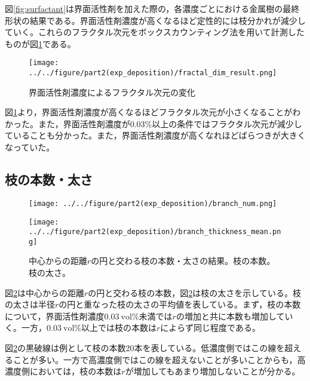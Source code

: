 \documentclass[autodetect-engine,dvi=dvipdfmx,a4paper,ja=standard,oneside,openany,11pt]{bxjsbook}
\begin{document}
図\ref{fig:surfactant}は界面活性剤を加えた際の，各濃度ごとにおける金属樹の最終形状の結果である。界面活性剤濃度が高くなるほど定性的には枝分かれが減少していく。これらのフラクタル次元をボックスカウンティング法を用いて計測したものが図\ref{fig:fractal_dim}である。

\begin{figure}[htbp]
  \centering
  \texttt{[image: ../../figure/part2(exp\_deposition)/fractal\_dim\_result.png]}
  \caption{界面活性剤濃度によるフラクタル次元の変化}
  \label{fig:fractal_dim}
\end{figure}

図\ref{fig:fractal_dim}より，界面活性剤濃度が高くなるほどフラクタル次元が小さくなることがわかった。また，界面活性剤濃度が0.03\%以上の条件ではフラクタル次元が減少していることも分かった。また，界面活性剤濃度が高くなれほどばらつきが大きくなっていた。

\subsection{枝の本数・太さ}

\begin{figure}[htbp]
  \begin{minipage}
    {0.45\textwidth}
    \subcaption{}
    \centering
    \texttt{[image: ../../figure/part2(exp\_deposition)/branch\_num.png]}
    \label{fig:branch_number}
  \end{minipage}
  \begin{minipage}
    {0.45\textwidth}
    \subcaption{}
    \centering
    \texttt{[image: ../../figure/part2(exp\_deposition)/branch\_thickness\_mean.png]}
    \label{fig:branch_thickness}
  \end{minipage}
  \caption{中心からの距離$r$の円と交わる枝の本数・太さの結果。枝の本数。枝の太さ。}
  \label{fig:branch}
\end{figure}

図\ref{fig:branch}は中心からの距離$r$の円と交わる枝の本数，図\ref{fig:branch}は枝の太さを示している。枝の太さは半径$r$の円と重なった枝の太さの平均値を表している。まず，枝の本数について，界面活性剤濃度$\SI{0.03}{\mathrm{vol}\%}$未満では$r$の増加と共に本数も増加していく。一方，$\SI{0.03}{\mathrm{vol}\%}$以上では枝の本数は$r$によらず同じ程度である。

図\ref{fig:branch}の黒破線は例として枝の本数20本を表している。低濃度側ではこの線を超えることが多い。一方で高濃度側ではこの線を超えないことが多いことからも，高濃度側においては，枝の本数は$r$が増加してもあまり増加しないことが分かる。
\end{document}
